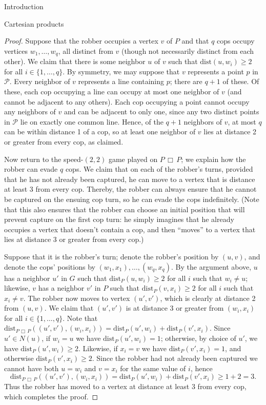 \documentclass[12pt]{amsart}
\theoremstyle{definition}
\def\cart{\, \Box \,}
\begin{document}
\begin{section}{Introduction}
\begin{section}{Cartesian products}
\begin{proof}
Suppose that the robber occupies a vertex $v$ of $P$ and that $q$ cops occupy vertices $w_1, \dots, w_q$, all distinct from $v$ (though not necessarily distinct from each other).  We claim that there is some neighbor $u$ of $v$ such that $\textrm{dist}(u,w_i) \ge 2$ for all $i \in \{1, \dots, q\}$.  By symmetry, we may suppose that $v$ represents a point $p$ in $\mathcal{P}$.  Every neighbor of $v$ represents a line containing $p$; there are $q+1$ of these.  Of these, each cop occupying a line can occupy at most one neighbor of $v$ (and cannot be adjacent to any others).  Each cop occupying a point cannot occupy any neighbors of $v$ and can be adjacent to only one, since any two distinct points in $\mathcal{P}$ lie on exactly one common line.  Hence, of the $q+1$ neighbors of $v$, at most $q$ can be within distance 1 of a cop, so at least one neighbor of $v$ lies at distance 2 or greater from every cop, as claimed.

Now return to the speed-$(2,2)$ game played on $P \cart P$; we explain how the robber can evade $q$ cops.  We claim that on each of the robber's turns, provided that he has not already been captured, he can move to a vertex that is distance at least 3 from every cop.  Thereby, the robber can always ensure that he cannot be captured on the ensuing cop turn, so he can evade the cops indefinitely.  (Note that this also ensures that the robber can choose an initial position that will prevent capture on the first cop turn: he simply imagines that he already occupies a vertex that doesn't contain a cop, and then ``moves'' to a vertex that lies at distance 3 or greater from every cop.)

Suppose that it is the robber's turn; denote the robber's position by $(u,v)$, and denote the cops' positions by $(w_1,x_1), \dots, (w_q,x_q)$.  By the argument above, $u$ has a neighbor $u'$ in $G$ such that $\textrm{dist}_P(u,w_i) \ge 2$ for all $i$ such that $w_i \not = u$; likewise, $v$ has a neighbor $v'$ in $P$ such that $\textrm{dist}_P(v,x_i) \ge 2$ for all $i$ such that $x_i \not = v$.  The robber now moves to vertex $(u',v')$, which is clearly at distance 2 from $(u,v)$.  We claim that $(u',v')$ is at distance 3 or greater from $(w_i,x_i)$ for all $i \in \{1, \dots, q\}$.  Note that $\textrm{dist}_{P \cart P}((u',v'),(w_i,x_i)) = \textrm{dist}_P(u',w_i) + \textrm{dist}_P(v',x_i)$.  Since $u' \in N(u)$, if $w_i = u$ we have $\textrm{dist}_P(u',w_i) = 1$; otherwise, by choice of $u'$, we have $\textrm{dist}_P(u',w_i) \ge 2$.  Likewise, if $x_i = v$ we have $\textrm{dist}_P(v',x_i) = 1$, and otherwise $\textrm{dist}_P(v',x_i) \ge 2$.  Since the robber had not already been captured we cannot have both $u=w_i$ and $v=x_i$ for the same value of $i$, hence $$\textrm{dist}_{P \cart P}((u',v'),(w_i,x_i)) = \textrm{dist}_P(u',w_i) + \textrm{dist}_P(v',x_i) \ge 1+2 = 3.$$
Thus the robber has moved to a vertex at distance at least 3 from every cop, which completes the proof.
\end{proof}


\end{section}
\end{section}
\end{document}
